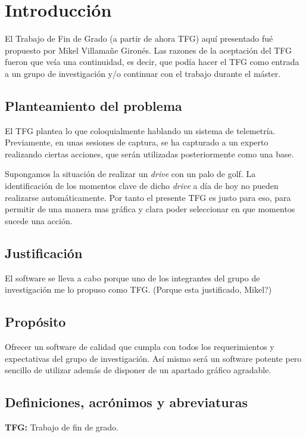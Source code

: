 \chapter{Introducci\'{o}n} 
El Trabajo de Fin de Grado (a partir de ahora TFG) aqu\'{i} presentado fu\'{e} propuesto por Mikel Villama\~{n}e Giron\'{e}s.
Las razones de la aceptaci\'{o}n del TFG fueron que ve\'{i}a una continuidad, es decir, que pod\'{i}a hacer el TFG como entrada
a un grupo de investigaci\'{o}n y/o continuar con el trabajo durante el m\'{a}ster.

\section{Planteamiento del problema}
El TFG plantea lo que coloquialmente hablando un sistema de telemetr\'{i}a. Previamente, en unas sesiones de captura, se ha capturado
a un experto realizando ciertas acciones, que ser\'{a}n utilizadas posteriormente como una base.

Supongamos la situaci\'{o}n de realizar un \emph{drive} con un palo de golf. La identificaci\'{o}n de los momentos clave de dicho \emph{drive}
a d\'{i}a de hoy no pueden realizarse autom\'{a}ticamente. Por tanto el presente TFG es justo para eso, para permitir de una manera
mas gr\'{a}fica y clara poder seleccionar en que momentos sucede una acci\'{o}n.

\section{Justificaci\'{o}n}

El software se lleva a cabo porque uno de los integrantes del grupo de investigaci\'{o}n me lo propuso como TFG. (Porque esta justificado,
Mikel?)

\section{Prop\'{o}sito}
Ofrecer un software de calidad que cumpla con todos los requerimientos y expectativas del grupo de investigaci\'{o}n.
As\'{i} mismo ser\'{a} un software potente pero sencillo de utilizar adem\'{a}s de disponer de un apartado gr\'{a}fico agradable.

\section{Definiciones, acr\'{o}nimos y abreviaturas}
\textbf{TFG:} Trabajo de fin de grado.

